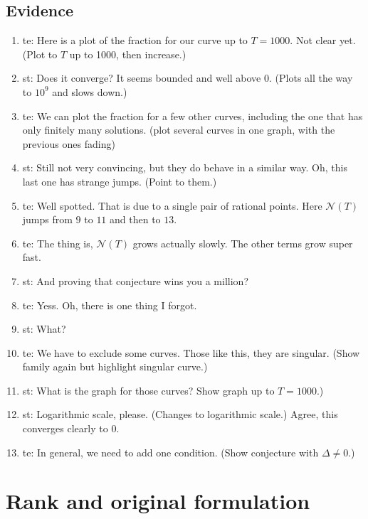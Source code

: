 \documentclass[a4paper]{article}
\begin{document}
\subsection{Evidence}
\begin{enumerate}
  \item te: Here is a plot of the fraction for our curve up to $T = 1000$. Not clear yet. (Plot to $T$ up to 1000, then increase.)
  \item st: Does it converge? It seems bounded and well above $0$. (Plots all the way to $10^9$ and slows down.)
  \item te: We can plot the fraction for a few other curves, including the one that has only finitely many solutions. (plot several curves in one graph, with the previous ones fading)
  \item st: Still not very convincing, but they do behave in a similar way. Oh, this last one has strange jumps. (Point to them.)
  \item te: Well spotted. That is due to a single pair of rational points.
  Here $\mathcal{N}(T)$ jumps from $9$ to $11$ and then to $13$.
  \item te: The thing is, $\mathcal{N}(T)$ grows actually slowly. The other terms grow super fast.
  \item st: And proving that conjecture wins you a million?
  \item te: Yess. Oh, there is one thing I forgot.
  \item st: What?
  \item te: We have to exclude some curves. Those like this, they are singular. (Show family again but highlight singular curve.)
  \item st: What is the graph for those curves? Show graph up to $T=1000$.)
  \item st: Logarithmic scale, please. (Changes to logarithmic scale.) Agree, this converges clearly to $0$.
  \item te: In general, we need to add one condition. (Show conjecture with $\Delta \neq 0$.)
\end{enumerate}


\section{Rank and original formulation}
\end{document}

